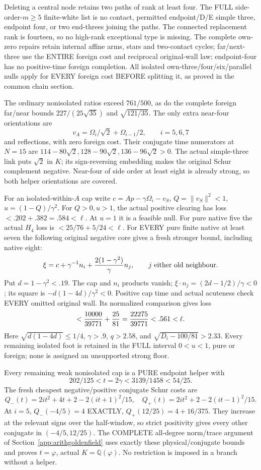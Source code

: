 Deleting a central node retains two paths
of rank at least four.
The FULL side-order-\(m\ge5\) finite-white
list is no contact, permitted endpoint/D/E
simple three, endpoint four, or two end-threes
joining the paths.
The connected replacement rank is fourteen,
so no high-rank exceptional type is missing.
The complete own-zero repairs retain internal
affine arms, stars and two-contact cycles;
far/next-three use the ENTIRE foreign cost
and reciprocal original-wall law;
endpoint-four has no positive-time foreign
completion.
All isolated own-three/four/six/parallel nulls
apply for EVERY foreign cost BEFORE splitting it,
as proved in the common chain section.

The ordinary nonisolated ratios exceed \(761/500\),
as do the complete foreign far/near bounds
\(227/(25\sqrt{35})\) and \(\sqrt{121/35}\).
The only extra near-four orientations are
\[
                   v_A=\Omega_i/\sqrt2+\Omega_{i-1}/2,
                         \qquad i=5,6,7
\]
and reflections, with zero foreign cost.
Their conjugate time numerators at \(N=15\)
are
\(114-80\sqrt2,128-90\sqrt2,136-96\sqrt2>0\).
The actual simple-three link puts \(\sqrt2\)
in \(K\); its sign-reversing embedding makes
the original Schur complement negative.
Near-four of side order at least eight is
already strong, so both helper orientations
are covered.

For an isolated-within-\(A\) cap write
\(c=Ap-\gamma\Omega_i-v_S\),
\(Q=\|v_S\|^2<1\), \(u=(1-Q)/\gamma^2\).
For \(Q>0,u>1\), the actual positive clearing
has loss \(<.202+.382=.584<\ell\).
At \(u=1\) it is a feasible null.
For pure native five the actual \(H_4\)
loss is \(<25/76+5/24<\ell\).
For EVERY pure finite native at least seven
the following original negative core gives
a fresh stronger bound, including native eight:
\[
 \xi=c+\gamma^{-1}n_i+
                    {2(1-\gamma^2)\over\gamma}n_j,
 \qquad j\text{ either old neighbour}.
\]
Put \(d=1-\gamma^2<.19\).
The cap and \(n_i\) products vanish;
\(\xi\cdot n_j=(2d-1/2)/\gamma<0\);
its square is \(-d(1-4d)/\gamma^2<0\).
Positive cap time and actual acuteness check
EVERY omitted original wall.
Its normalized comparison gives loss
\[
 <{10000\over39771}+{25\over81}
       ={22275\over39771}<.561<\ell .
\]
Here \(\sqrt{d(1-4d)}\le1/4\),
\(\gamma>.9\), \(q>2.58\), and
\(\sqrt{D_i-100/81}>2.33\).
Every remaining isolated foot is retained in
the FULL interval \(0<u<1\), pure or foreign;
none is assigned an unsupported strong floor.

Every remaining weak nonisolated cap is a PURE
endpoint helper with
\[
 202/125<t=2\gamma<3139/1458<54/25.
\]
The fresh cheapest negative/positive conjugate
Schur costs are
\[
 Q_-(t)=2it^2+4t+2-2(it+1)^2/15,\quad
 Q_+(t)=2it^2+2-2(it-1)^2/15 .
\]
At \(i=5\), \(Q_-(-4/5)=4\) EXACTLY,
\(Q_+(12/25)=4+16/375\).
They increase at the relevant signs over the
half-window, so strict positivity gives every
other conjugate in \((-4/5,12/25)\).
The COMPLETE all-degree norm/trace argument
of Section~\ref{app:arithgoldenfield} uses exactly
these physical/conjugate bounds and proves
\(t=\varphi\), actual \(K=\mathbb Q(\varphi)\).
No restriction is imposed in a branch without
a helper.

